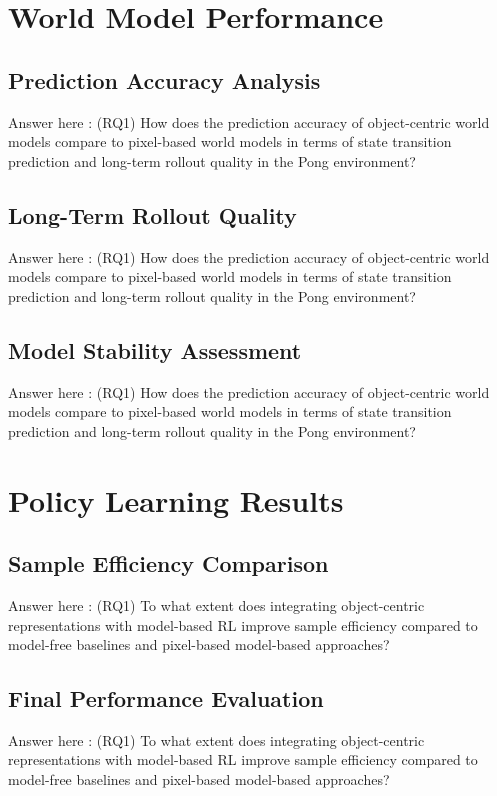 \documentclass[
	english,
	ruledheaders=section,
	class=report,
	thesis={type=master},
	accentcolor=9c,
	custommargins=true,
	marginpar=false,
	parskip=half-,
	fontsize=11pt,
]{tudapub}
\begin{document}
\section{World Model Performance}
\label{sec:world_model_perf}

\subsection{Prediction Accuracy Analysis}
\label{subsec:prediction_accuracy}
Answer here : (RQ1) How does the prediction accuracy of object-centric world models compare to pixel-based world models in terms of state transition prediction and long-term rollout quality in the Pong environment?

\subsection{Long-Term Rollout Quality}
\label{subsec:rollout_quality}
Answer here : (RQ1) How does the prediction accuracy of object-centric world models compare to pixel-based world models in terms of state transition prediction and long-term rollout quality in the Pong environment?

\subsection{Model Stability Assessment}
\label{subsec:stability}
Answer here : (RQ1) How does the prediction accuracy of object-centric world models compare to pixel-based world models in terms of state transition prediction and long-term rollout quality in the Pong environment?

\section{Policy Learning Results}
\label{sec:policy_results}

\subsection{Sample Efficiency Comparison}
\label{subsec:sample_efficiency_comp}
Answer here : (RQ1) To what extent does integrating object-centric representations with model-based RL improve sample efficiency compared to model-free baselines and pixel-based model-based approaches?


\subsection{Final Performance Evaluation}
\label{subsec:final_performance}
Answer here : (RQ1) To what extent does integrating object-centric representations with model-based RL improve sample efficiency compared to model-free baselines and pixel-based model-based approaches?
\end{document}
